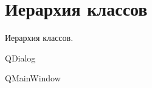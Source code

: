 \section{Иерархия классов}
Иерархия классов.\begin{DoxyCompactList}
\item {}
\item Q\+Dialog\begin{DoxyCompactList}
\item {}
\item {}
\end{DoxyCompactList}
\item Q\+Main\+Window\begin{DoxyCompactList}
\item {}
\end{DoxyCompactList}
\end{DoxyCompactList}
